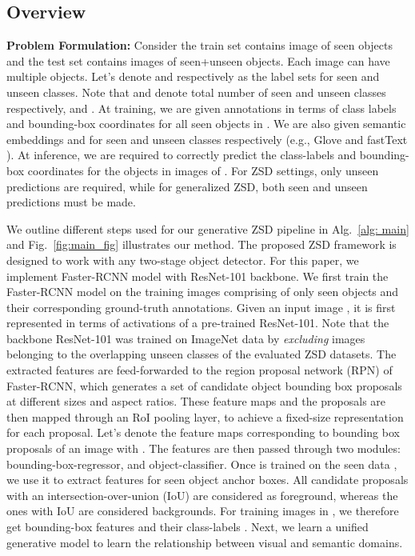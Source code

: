 \documentclass[runningheads]{llncs}
\begin{document}
\subsection{Overview}
\noindent \textbf{Problem Formulation:} Consider the train set   contains image of seen objects and the test set   contains images of seen+unseen objects. Each image can have multiple objects.  Let's denote  and  respectively as the label sets for seen and unseen classes. Note that  and  denote total number of seen and unseen classes respectively, and . At training, we are given annotations in terms of class labels  and bounding-box coordinates  for all seen objects in . We are also given semantic embeddings  and  for seen and unseen classes respectively (e.g., Glove \cite{pennington2014glove} and fastText \cite{joulin2017bag}). At inference, we are required to correctly predict the class-labels and bounding-box coordinates for the objects in images of . For ZSD settings, only unseen predictions are required, while for generalized ZSD, both seen and unseen predictions must be made.


We outline different steps used for our generative ZSD pipeline in Alg.~\ref{alg: main} and Fig.~\ref{fig:main_fig} illustrates our method. The proposed ZSD framework is designed to work with any two-stage object detector. For this paper, we implement Faster-RCNN model with ResNet-101 backbone. We first train the Faster-RCNN model  on the training images  comprising of only seen objects and their corresponding ground-truth annotations. Given an input image , it is first represented in terms of activations of a pre-trained ResNet-101. Note that the backbone ResNet-101 was trained on ImageNet data by \emph{excluding} images belonging to the overlapping unseen classes of the evaluated ZSD datasets. The extracted features are feed-forwarded to the region proposal network (RPN) of Faster-RCNN, which generates a set of candidate object bounding box proposals at different sizes and aspect ratios. These feature maps and the proposals are then mapped through an RoI pooling layer, to achieve a fixed-size representation for each proposal. Let's denote the feature maps corresponding to  bounding box proposals of an image with . The features  are then passed through two modules: bounding-box-regressor, and object-classifier. Once  is trained on the seen data , we use it to extract features for seen object anchor boxes. All candidate proposals with an intersection-over-union (IoU)  are considered as foreground, whereas the ones with IoU  are considered backgrounds. For  training images in , we therefore get bounding-box features  and their class-labels . Next, we learn a unified generative model to learn the relationship between visual and semantic domains. 
\end{document}
